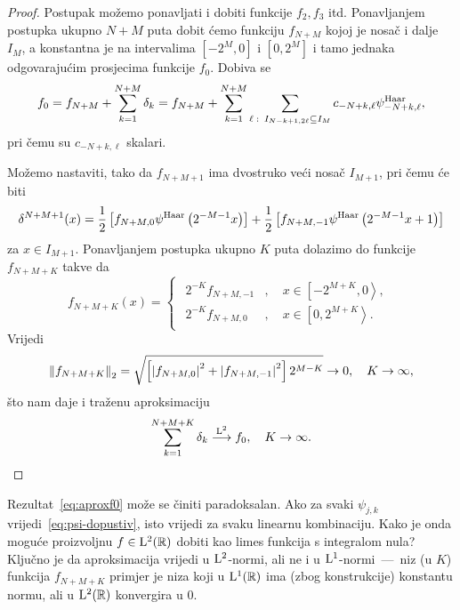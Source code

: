 \documentclass[main.tex]{subfiles}
\begin{document}
\begin{proof}
	Postupak možemo ponavljati i dobiti funkcije \( f_2, f_3 \) itd. Ponavljanjem
	postupka ukupno \( N+M \) puta dobit ćemo funkciju \( f_{N+M} \)
	kojoj je nosač i dalje \( I_M \), a konstantna je na intervalima
	\( \left[ -2^M,0 \right] \) i \( \left[ 0,2^M \right] \)
	i tamo jednaka odgovarajućim prosjecima funkcije \( f_0 \).
	Dobiva se
	\begin{equation}
		f_0 = f_{N+M} + \sum_{k=1}^{N+M} \delta_k
		= f_{N+M} + \sum_{k=1}^{N+M} \sum_{\ell \, \colon \, I_{N-k+1, 2\ell} \subseteq I_M}
		c_{-N+k, \ell} \psi^{\mathrm{Haar}}_{-N+k,\ell},
	\end{equation}
	pri čemu su \( c_{-N+k,\ell} \) skalari.

	Možemo nastaviti, tako da \( f_{N+M+1} \) ima
	dvostruko veći nosač \( I_{M+1} \), pri čemu će biti
	\[ \delta^{N+M+1}(x) = \frac12 \left[ f_{N+M,0} \psi^{\mathrm{Haar}}\left( 2^{-M-1}x \right) \right]
		+ \frac 12 \left[ f_{N+M,-1}\psi^{\mathrm{Haar}}\left( 2^{-M-1}x + 1 \right) \right]\]
	za \( x \in I_{M+1} \). Ponavljanjem postupka ukupno \( K \) puta dolazimo do funkcije
	\( f_{N+M+K} \) takve da
	\begin{equation}
		f_{N+M+K}(x) = \begin{cases}
			\begin{aligned}
				2^{-K}f_{N+M,-1} & , \quad  x \in  \left[ -2^{M+K}, 0 \right\rangle, \\
				2^{-K}f_{N+M,0}  & , \quad x \in \left[ 0, 2^{M+K} \right\rangle.
			\end{aligned}
		\end{cases}
	\end{equation}
	Vrijedi \begin{equation} \left\lVert f_{N+M+K}\right\rVert_2 = \sqrt{\left[ \left| {f_{N+M,0}} \right|^2+\left| {f_{N+M,-1}} \right|^2 \right] 2^{M-K}} \rightarrow 0, \quad K \rightarrow \infty,
	\end{equation}
	što nam daje i traženu aproksimaciju
	\begin{equation}\label{eq:aproxf0}
		\sum_{k=1}^{N+M+K} \delta_k \stackrel{\mathrm{L}^2}{\longrightarrow} f_0, \quad K \rightarrow \infty.
	\end{equation}
\end{proof}

\begin{komentar}
	Rezultat~\eqref{eq:aproxf0} može se činiti paradoksalan.
	Ako za svaki \( \psi_{j,k} \) vrijedi~\eqref{eq:psi-dopustiv},
	isto vrijedi za svaku linearnu kombinaciju. Kako je onda moguće proizvoljnu
	\( f \in \mathrm{L}^2(\mathbb{R}) \) dobiti kao limes funkcija s integralom nula?
	Ključno je da aproksimacija vrijedi u \( \mathrm{L}^2 \)-normi,
	ali ne i u \( \mathrm{L}^1 \)-normi~---~niz (u \(K\)) funkcija \( f_{N+M+K} \)
	primjer je niza koji u \( \mathrm{L}^1(\mathbb{R}) \) ima (zbog konstrukcije) konstantu normu, ali u \( \mathrm{L}^2(\mathbb{R}) \)
	konvergira u \( 0 \).
\end{komentar}
\end{document}
